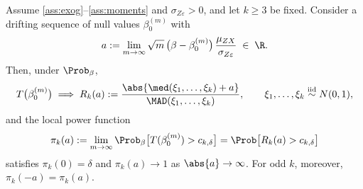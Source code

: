 \begin{proposition}
\label{prop:sn_local}
Assume \ref{ass:exog}--\ref{ass:moments} and $\sigma_{Z\varepsilon} > 0$, and let $k \ge 3$ be fixed. Consider a drifting sequence of null values $\beta_0^{(m)}$ with
\[
  a := \lim_{m\to\infty}\sqrt{m}\,\bigl(\beta - \beta_0^{(m)}\bigr)\,\frac{\mu_{ZX}}{\sigma_{Z\varepsilon}} \;\in\; \R.
\]
Then, under $\Prob_\beta$,
\[
  T\bigl(\beta_0^{(m)}\bigr) \;\Longrightarrow\; R_k(a) := \frac{\abs{\med(\xi_1,\dots,\xi_k) + a}}{\MAD(\xi_1,\dots,\xi_k)},
  \qquad \xi_1,\dots,\xi_k \overset{\text{iid}}{\sim} N(0,1),
\]
and the local power function
\[
  \pi_k(a) := \lim_{m\to\infty}\Prob_\beta\bigl[T(\beta_0^{(m)}) > c_{k,\delta}\bigr] = \Prob\bigl[R_k(a) > c_{k,\delta}\bigr]
\]
satisfies $\pi_k(0) = \delta$ and $\pi_k(a) \to 1$ as $\abs{a} \to \infty$. For odd $k$, moreover, $\pi_k(-a) = \pi_k(a)$.
\end{proposition}

